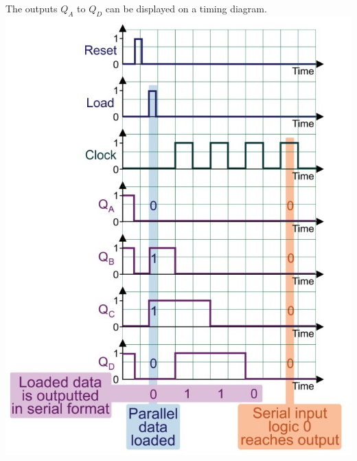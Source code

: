 \documentclass[a4paper,11pt, twocolumn]{article}
\begin{document}
The outputs $Q_A$ to $Q_D$ can be displayed on a timing diagram.
\includegraphics[width=\linewidth]{pisoTiming.jpg}
\end{document}
